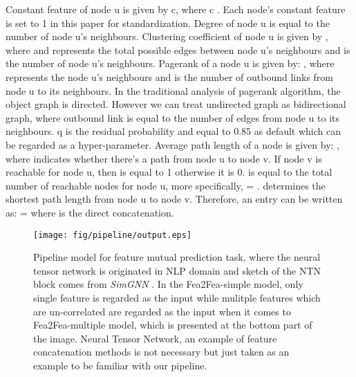 \documentclass[runningheads]{llncs}
\newcommand{\xhdr}[1]{\vspace{1.7mm}\noindent{{\bf #1}}}
\begin{document}
\xhdr{Feature extraction} Constant feature of node u  is given by c, 
where c . Each node's constant feature is set to 1 in this paper for standardization. 
Degree of node u  is equal to the number of node u's 
neighbours. 
Clustering coefficient of node u  is given by , where  and  represents the total possible edges between node u's 
neighbours and
 is the number of node u's neighbours. Pagerank of a node u  is given by:
 ,
where  represents the node u's neighbours and  is the number of outbound links 
from node u
to its neighbours. In the traditional analysis of pagerank algorithm, the object graph is directed. 
However we can treat
undirected graph as bidirectional graph, where outbound link is equal to the number of edges from node u to 
its neighbours.
q is the residual probability and equal to 0.85 as default which can be regarded as a hyper-parameter. Average path 
length of a node   is given by:
,
where  indicates whether there's a path from node u to node v. If node v is reachable for node u,
then  is equal to 1 otherwise it is 0.  is equal to the total number of reachable nodes 
for node u,
more specifically,  = .  determines 
the shortest path
length from node u to node v.
Therefore, an entry  can be written as:    =  where  is the 
direct concatenation.
\vspace{-0.5cm}
\begin{figure}
  \centering
  \texttt{[image: fig/pipeline/output.eps]}
  \caption{Pipeline model for feature mutual prediction task, where 
the neural tensor network is originated in NLP domain \cite
{NIPS2013_b337e84d} and sketch of the NTN block comes from \textit
{SimGNN} \cite{bai2020simgnn}. In the Fea2Fea-simple model, only single feature is regarded as the input while mulitple features which are un-correlated are regarded as the input when it comes to Fea2Fea-multiple model, which is presented at the bottom part of the image. Neural Tensor Network, an example of feature concatenation methods is not necessary but just taken as an example to be familiar with our pipeline. }
\end{figure}

\vspace{-1.2cm}
\end{document}
